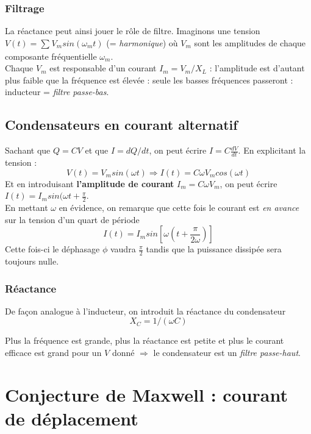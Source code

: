 \documentclass[british,french,11pt, a4paper, openany]{book}
\begin{document}
	\subsubsection{Filtrage}
	La réactance peut ainsi jouer le rôle de filtre. Imaginons une tension $V(t) = \sum_{}^{} V_m sin(\omega_m t)$ (= \textit{harmonique}) où $V_m$ sont les amplitudes de chaque composante fréquentielle $\omega_m$.\\
	
	Chaque $V_m$ est responsable d'un courant $I_m = V_m / X_L$ : l'amplitude est d'autant plus faible que la fréquence est élevée : seule les basses fréquences passeront : inducteur = \textit{filtre passe-bas}.
	
	\subsection{Condensateurs en courant alternatif}
	Sachant que $Q = CV$ et que $I = dQ/dt$, on peut écrire $I = C \frac{dV}{dt}$. En explicitant la tension : 
	\begin{equation}
		V(t) = V_m sin(\omega t) \Rightarrow I(t) = C\omega V_m cos(\omega t)
	\end{equation}
	Et en introduisant \textbf{l'amplitude de courant} $I_m = C\omega V_m$, on peut écrire $I(t) = I_m sin(\omega t + \frac{\pi}{2}$.\\
	En mettant $\omega$ en évidence, on remarque que cette fois le courant est \textit{en avance} sur la tension d'un quart de période
	\begin{equation}
		I(t) = I_m sin\left[\omega (t + \frac{\pi}{2\omega})\right]
	\end{equation}
	Cette fois-ci le déphasage $\phi$ vaudra $\frac{\pi}{2}$ tandis que la puissance dissipée sera toujours nulle.
	\subsubsection*{Réactance}
	De façon analogue à l'inducteur, on introduit la réactance du condensateur \begin{equation}
	X_C = 1/(\omega C)
	\end{equation}
	
	Plus la fréquence est grande, plus la réactance est petite et plus le courant efficace est grand pour un $V$ donné $\Rightarrow$ le condensateur est un \textit{filtre passe-haut}.
	
	\section{Conjecture de Maxwell : courant de déplacement}
\end{document}
